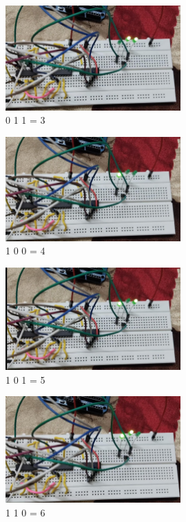 \documentclass[a4paper,12pt]{article}
\begin{document}
\begin{figure}[H]
\centering
\includegraphics[width=0.6\textwidth]{figs/4.jpeg}
\caption*{0 1 1 = 3}
\end{figure}
\begin{figure}[H]
\centering
\includegraphics[width=0.6\textwidth]{figs/5.jpeg}
\caption*{1 0 0 = 4}
\end{figure}
\begin{figure}[H]
\centering
\includegraphics[width=0.6\textwidth]{figs/6.jpeg}
\caption*{1 0 1 = 5}
\end{figure}
\begin{figure}[H]
\centering
\includegraphics[width=0.6\textwidth]{figs/7.jpeg}
\caption*{1 1 0 = 6}
\end{figure}
\end{document}
